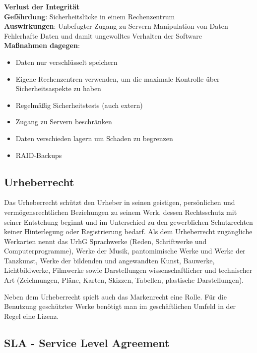 \documentclass[10pt]{article}
\begin{document}
\vspace{1cm}
\textbf{Verlust der Integrität} \\
\textbf{Gefährdung}: Sicherheitslücke in einem Rechenzentrum \\
\textbf{Auswirkungen}: Unbefugter Zugang zu Servern Manipulation von Daten \\
Fehlerhafte Daten und damit ungewolltes Verhalten der Software \\
\textbf{Maßnahmen dagegen}: 
\begin{itemize}
\item Daten nur verschlüsselt speichern
\item Eigene Rechenzentren verwenden, um die maximale Kontrolle über Sicherheitsaspekte zu haben
\item Regelmäßig Sicherheitstests (auch extern)
\item Zugang zu Servern beschränken
\item Daten verschieden lagern um Schaden zu begrenzen
\item RAID-Backups
\end{itemize}
\vspace{1cm}

\subsection{Urheberrecht}

Das Urheberrecht schützt den Urheber in seinen geistigen, persönlichen und vermögensrechtlichen Beziehungen zu seinem Werk, dessen Rechtsschutz mit seiner Entstehung beginnt und im Unterschied zu den gewerblichen Schutzrechten keiner Hinterlegung oder Registrierung bedarf. Als dem Urheberrecht zugängliche Werkarten nennt das UrhG Sprachwerke (Reden, Schriftwerke und Computerprogramme), Werke der Musik, pantomimische Werke und Werke der Tanzkunst, Werke der bildenden und angewandten Kunst, Bauwerke, Lichtbildwerke, Filmwerke sowie Darstellungen wissenschaftlicher und technischer Art (Zeichnungen, Pläne, Karten, Skizzen, Tabellen, plastische Darstellungen).

Neben dem Urheberrecht spielt auch das Markenrecht eine Rolle. Für die Benutzung geschützter Werke benötigt man im geschäftlichen Umfeld in der Regel eine Lizenz. 

\subsection{SLA - Service Level Agreement}
\end{document}
